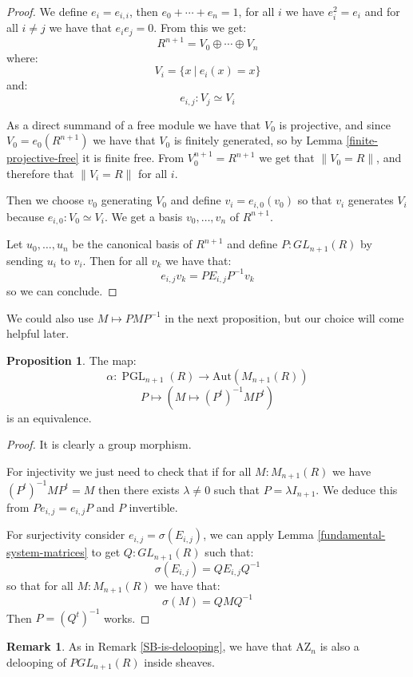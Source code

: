 \documentclass[10pt,a4paper]{article}
\theoremstyle{definition}
\newtheorem{remark}[theorem]{Remark}
\newtheorem{proposition}[theorem]{Proposition}
\DeclareMathOperator{\PGL}{PGL}
\newcommand{\AZ}{\mathrm{AZ}}
\newcommand{\propTrunc}[1]{\lVert #1 \rVert}
\newcommand{\Aut}{\mathrm{Aut}}
\begin{document}
\begin{proof}
We define $e_i = e_{i,i}$, then $e_0+\cdots+e_n = 1$, for all $i$ we have $e_i^2=e_i$ and for all $i\not=j$ we have that $e_ie_j=0$. From this we get:
\[R^{n+1} = V_0\oplus\cdots\oplus V_n\]
where:
\[V_i = \{x\ |\ e_i(x)=x\}\]
and:
\[e_{i,j}:V_j\simeq V_i\]

As a direct summand of a free module we have that $V_0$ is projective, and since $V_0 = e_{0}(R^{n+1})$ we have that $V_0$ is finitely generated, so by Lemma \ref{finite-projective-free} it is finite free. From $V_0^{n+1}=R^{n+1}$ we get that $\propTrunc{V_0=R}$, and therefore that $\propTrunc{V_i=R}$ for all $i$.

Then we choose $v_0$ generating $V_0$ and define $v_i = e_{i,0}(v_0)$ so that $v_i$ generates $V_i$ because $e_{i,0}:V_0\simeq V_i$. We get a basis $v_0,\hdots,v_n$ of $R^{n+1}$.

Let $u_0,\hdots,u_n$ be the canonical basis of $R^{n+1}$ and define $P:GL_{n+1}(R)$ by sending $u_i$ to $v_i$. Then for all $v_k$ we have that:
\[e_{i,j}v_k = PE_{i,j}P^{-1}v_k\]
so we can conclude.
\end{proof}

We could also use $M\mapsto PMP^{-1}$ in the next proposition, but our choice will come helpful later.

\begin{proposition}\label{Aut-MnR-PGL}
The map:
\[\alpha:\PGL_{n+1}(R)\to\Aut(M_{n+1}(R))\]
\[P\mapsto (M\mapsto (P^t)^{-1}MP^t)\]
is an equivalence.
\end{proposition}

\begin{proof}
It is clearly a group morphism. 

For injectivity we just need to check that if for all $M:M_{n+1}(R)$ we have $(P^t)^{-1}MP^t=M$ then there exists $\lambda\not=0$ such that $P=\lambda I_{n+1}$. We deduce this from $Pe_{i,j} = e_{i,j}P$ and $P$ invertible.

For surjectivity consider $e_{i,j}=\sigma(E_{i,j})$, we can apply Lemma \ref{fundamental-system-matrices} to get $Q:GL_{n+1}(R)$ such that:
\[\sigma(E_{i,j}) = QE_{i,j}Q^{-1}\]
so that for all $M:M_{n+1}(R)$ we have that:
\[\sigma(M) = QMQ^{-1}\]
Then $P = (Q^t)^{-1}$ works.
\end{proof}

\begin{remark}\label{AZ-is-delooping}
As in Remark \ref{SB-is-delooping}, we have that $\AZ_n$ is also a delooping of $PGL_{n+1}(R)$ inside sheaves.
\end{remark}
\end{document}
